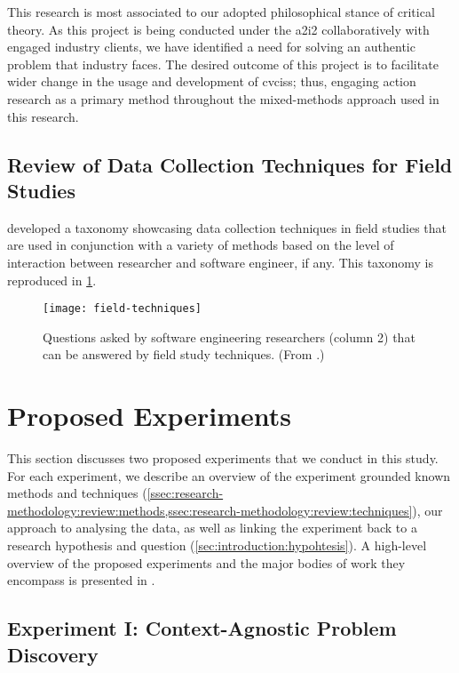 This research is most associated to our adopted philosophical stance of critical theory. As this project is being conducted under the \gls{a2i2} collaboratively with engaged industry clients, we have identified a need for solving an authentic problem that industry faces. The desired outcome of this project is to facilitate wider change in the usage and development of \glspl{cvcis}; thus, engaging action research as a primary method throughout the mixed-methods approach used in this research.

\subsection{Review of Data Collection Techniques for Field Studies}
\label{ssec:research-methodology:review:techniques}

\citeauthor{Singer:2007tu} developed a taxonomy \citep{Singer:2007tu,Lethbridge:2005jv} showcasing data collection techniques in field studies that are used in conjunction with a variety of methods based on the level of interaction between researcher and software engineer, if any. This taxonomy is reproduced in \cref{fig:research-methodology:review:field-techniques}.

\begin{figure}[p!]
\centering
\caption[Review of field study techniques]{Questions asked by software engineering researchers (column 2) that can be answered by field study techniques. (From \citep{Singer:2007tu}.)}
\label{fig:research-methodology:review:field-techniques}
\texttt{[image: field-techniques]}
\end{figure}


\section{Proposed Experiments}

This section discusses two proposed experiments that we conduct in this study. For each experiment, we describe an overview of the experiment grounded known methods and techniques (\cref{ssec:research-methodology:review:methods,ssec:research-methodology:review:techniques}), our approach to analysing the data, as well as linking the experiment back to a research hypothesis and question (\cref{sec:introduction:hypohtesis}). A high-level overview of the proposed experiments and the major bodies of work they encompass is presented in .

\subsection{Experiment I: Context-Agnostic Problem Discovery}

